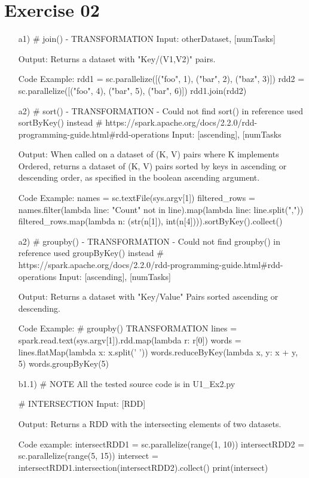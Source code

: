 \documentclass[11pt,a4paper]{scrartcl}
\begin{document}
\section*{Exercise 02}
\begin{itemize}
	\item[a1)]
		# join() - TRANSFORMATION	
		Input:
		otherDataset, [numTasks]
		
		Output:
		Returns a dataset with "Key/(V1,V2)" pairs.
		
		Code Example:
    		rdd1 = sc.parallelize([("foo", 1), ("bar", 2), ("baz", 3)])
    		rdd2 = sc.parallelize([("foo", 4), ("bar", 5), ("bar", 6)])
    		rdd1.join(rdd2)
	\item[a2)]
    		# sort() - TRANSFORMATION - Could not find sort() in reference used sortByKey() instead
    		# https://spark.apache.org/docs/2.2.0/rdd-programming-guide.html#rdd-operations
    		Input:
		[ascending], [numTasks
		
		Output:
		When called on a dataset of (K, V) pairs where K implements Ordered, returns a dataset of (K, V) pairs sorted by keys in ascending or 			descending order, as specified in the boolean ascending argument.
		
		Code Example:
    		names = sc.textFile(sys.argv[1])
    		filtered_rows = names.filter(lambda line: "Count" not in line).map(lambda line: line.split(","))
    		filtered_rows.map(lambda n: (str(n[1]), int(n[4]))).sortByKey().collect()
	\item[a2)]
    		# groupby() - TRANSFORMATION - Could not find groupby() in reference used groupByKey() instead
    		# https://spark.apache.org/docs/2.2.0/rdd-programming-guide.html#rdd-operations
    		Input:
		[ascending], [numTasks]
		
		Output:
		Returns a dataset with "Key/Value" Pairs sorted ascending or descending.
		
		Code Example:
		# groupby() TRANSFORMATION
    		lines = spark.read.text(sys.argv[1]).rdd.map(lambda r: r[0])
    		words = lines.flatMap(lambda x: x.split(' '))
    		words.reduceByKey(lambda x, y: x + y, 5)
    		words.groupByKey(5)
    
	\item[b1.1)]
		# NOTE
		All the tested source code is in U1_Ex2.py
	
		# INTERSECTION
		Input:
		[RDD]
		
		Output:
		Returns a RDD with the intersecting elements of two datasets.
		
		Code example:
		intersectRDD1 = sc.parallelize(range(1, 10))
    		intersectRDD2 = sc.parallelize(range(5, 15))
    		intersect = intersectRDD1.intersection(intersectRDD2).collect()
    		print(intersect)
		

\end{itemize}
\end{document}
